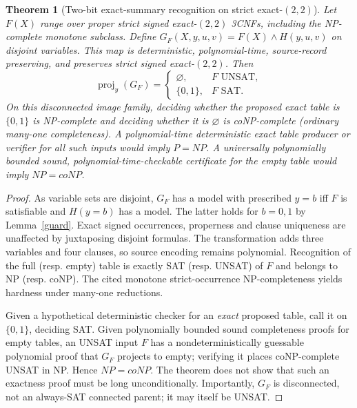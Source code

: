 \documentclass[11pt]{article}
\newtheorem{theorem}{Theorem}
\newcommand{\proj}{\operatorname{proj}}
\begin{document}
\begin{theorem}[Two-bit exact-summary recognition on strict exact-$(2,2)$]\label{thm:hard}
Let $F(X)$ range over proper strict signed exact-$(2,2)$ 3CNFs, including the NP-complete monotone subclass. Define $G_F(X,y,u,v)=F(X)\wedge H(y,u,v)$ on disjoint variables. This map is deterministic, polynomial-time, source-record preserving, and preserves strict signed exact-$(2,2)$. Then
\[
\proj_{y}(G_F)=\begin{cases}
\varnothing,&F\text{ UNSAT},\\
\{0,1\},&F\text{ SAT}.
\end{cases}
\]
On this \emph{disconnected image family}, deciding whether the proposed exact table is $\{0,1\}$ is NP-complete and deciding whether it is $\varnothing$ is coNP-complete (ordinary many-one completeness). A polynomial-time deterministic exact table producer or verifier for all such inputs would imply $P=NP$. A universally polynomially bounded sound, polynomial-time-checkable certificate for the empty table would imply $NP=coNP$.
\end{theorem}
\begin{proof}
As variable sets are disjoint, $G_F$ has a model with prescribed $y=b$ iff $F$ is satisfiable and $H(y=b)$ has a model. The latter holds for $b=0,1$ by Lemma~\ref{guard}. Exact signed occurrences, properness and clause uniqueness are unaffected by juxtaposing disjoint formulas. The transformation adds three variables and four clauses, so source encoding remains polynomial. Recognition of the full (resp. empty) table is exactly SAT (resp. UNSAT) of $F$ and belongs to NP (resp. coNP). The cited monotone strict-occurrence NP-completeness yields hardness under many-one reductions.

Given a hypothetical deterministic checker for an \emph{exact} proposed table, call it on $\{0,1\}$, deciding SAT. Given polynomially bounded sound completeness proofs for empty tables, an UNSAT input $F$ has a nondeterministically guessable polynomial proof that $G_F$ projects to empty; verifying it places coNP-complete UNSAT in NP. Hence $NP=coNP$. The theorem does not show that such an exactness proof must be long unconditionally. Importantly, $G_F$ is disconnected, not an always-SAT connected parent; it may itself be UNSAT.
\end{proof}
\end{document}
